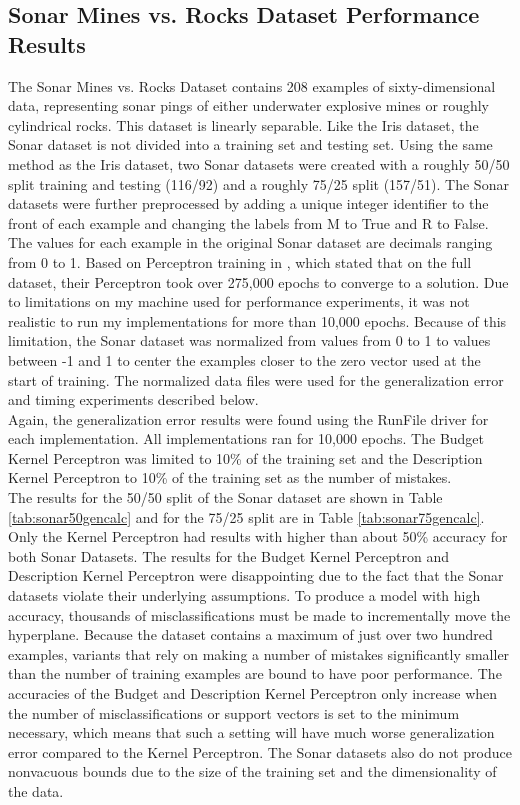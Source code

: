\subsection{Sonar Mines vs. Rocks Dataset Performance Results}\label{SonarResults}
The Sonar Mines vs. Rocks Dataset contains 208 examples of sixty-dimensional data, representing sonar pings of either underwater explosive mines or roughly cylindrical rocks. This dataset is linearly separable. Like the Iris dataset, the Sonar dataset is not divided into a training set and testing set. Using the same method as the Iris dataset, two Sonar datasets were created with a roughly 50/50 split training and testing (116/92) and a roughly  75/25 split (157/51). The Sonar datasets were further preprocessed by adding a unique integer identifier to the front of each example and changing the labels from M to True and R to False. 
\\The values for each example in the original Sonar dataset are decimals ranging from 0 to 1. Based on Perceptron training in \cite{MGS17}, which stated that on the full dataset, their Perceptron took over 275,000 epochs to converge to a solution. Due to limitations on my machine used for performance experiments, it was not realistic to run my implementations for more than 10,000 epochs. Because of this limitation, the Sonar dataset was normalized from values from 0 to 1 to values between -1 and 1 to center the examples closer to the zero vector used at the start of training. The normalized data files were used for the generalization error and timing experiments described below. 
\\Again, the generalization error results were found using the RunFile driver for each implementation. All implementations ran for 10,000 epochs. The Budget Kernel Perceptron was limited to 10\% of the training set and the Description Kernel Perceptron to 10\% of the training set as the number of mistakes.
\\The results for the 50/50 split of the Sonar dataset are shown in Table \ref{tab:sonar50gencalc} and for the 75/25 split are in Table \ref{tab:sonar75gencalc}. Only the Kernel Perceptron had results with higher than about 50\% accuracy for both Sonar Datasets. The results for the Budget Kernel Perceptron and Description Kernel Perceptron were disappointing due to the fact that the Sonar datasets violate their underlying assumptions. To produce a model with high accuracy, thousands of misclassifications must be made to incrementally move the hyperplane. Because the dataset contains a maximum of just over two hundred examples, variants that rely on making a number of mistakes significantly smaller than the number of training examples are bound to have poor performance. The accuracies of the Budget and Description Kernel Perceptron only increase when the number of misclassifications or support vectors is set to the minimum necessary, which means that such a setting will have much worse generalization error compared to the Kernel Perceptron. The Sonar datasets also do not produce nonvacuous bounds due to the size of the training set and the dimensionality of the data.

